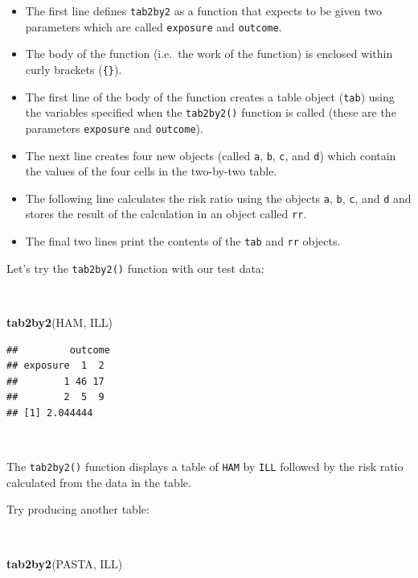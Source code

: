 \documentclass[12pt,a4paper]{book}
\newenvironment{Shaded}{\begin{snugshade}}{\end{snugshade}}
\newcommand{\KeywordTok}[1]{\textcolor[rgb]{0.13,0.29,0.53}{\textbf{#1}}}
\newcommand{\NormalTok}[1]{#1}
\theoremstyle{definition}
\theoremstyle{definition}
\theoremstyle{definition}
\theoremstyle{remark}
\begin{document}
\begin{itemize}
\item
  The first line defines \texttt{tab2by2} as a function that expects to
  be given two parameters which are called \texttt{exposure} and
  \texttt{outcome}.
\item
  The body of the function (i.e.~the work of the function) is enclosed
  within curly brackets (\texttt{\{\}}).
\item
  The first line of the body of the function creates a table object
  (\texttt{tab}) using the variables specified when the
  \texttt{tab2by2()} function is called (these are the parameters
  \texttt{exposure} and \texttt{outcome}).
\item
  The next line creates four new objects (called \texttt{a}, \texttt{b},
  \texttt{c}, and \texttt{d}) which contain the values of the four cells
  in the two-by-two table.
\item
  The following line calculates the risk ratio using the objects
  \texttt{a}, \texttt{b}, \texttt{c}, and \texttt{d} and stores the
  result of the calculation in an object called \texttt{rr}.
\item
  The final two lines print the contents of the \texttt{tab} and
  \texttt{rr} objects.
\end{itemize}

\newpage

Let's try the \texttt{tab2by2()} function with our test data:

~

\begin{Shaded}
\begin{Highlighting}[]
\KeywordTok{tab2by2}\NormalTok{(HAM, ILL)}
\end{Highlighting}
\end{Shaded}

\begin{verbatim}
##         outcome
## exposure  1  2
##        1 46 17
##        2  5  9
## [1] 2.044444
\end{verbatim}

~

The \texttt{tab2by2()} function displays a table of \texttt{HAM} by
\texttt{ILL} followed by the risk ratio calculated from the data in the
table.

Try producing another table:

~

\begin{Shaded}
\begin{Highlighting}[]
\KeywordTok{tab2by2}\NormalTok{(PASTA, ILL)}
\end{Highlighting}
\end{Shaded}
\end{document}

